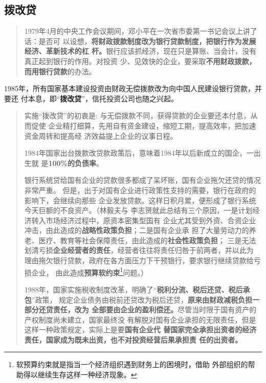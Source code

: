 \subsection{拨改贷}

\begin{quotation}
  1979年4月的中央工作会议期间，邓小平在一次省市委第一书记会议上讲了话：是否可
  以设想，\textbf{将财政拨款制度改为银行贷款制度，把银行作为发展经济、革新技术的杠
    杆。}银行应该抓经济，现在只是算账、当会计，没有真正起到银行的作用。对投资
  少、见效快的企业，要采取\textbf{不用财政拨款，而用银行贷款}的办法。\cite{bogaidai30}
\end{quotation}

1985年，所有国家基本建设投资由财政无偿拨款改为向中国人民建设银行贷款，并要还
付本息，即“\textbf{拨改贷}”，信托投资公司也随之兴起。
\begin{quotation}
  实施“拨改贷”的初衷是: 与无偿拨款不同，获得贷款的企业要还本付息，从而促使
  企业精打细算，先用自有资金建设，缩短工期，提高效率，把加速资金周转和提高经
  济效益提上企业的议事日程。

  1984年国家出台拨款改贷款政策后，意味着1984年以后新成立的国企，一出生就
  是\textbf{100\%的负债率}。\cite{bogaidaizhaizhuangu}


  银行系统贷给国有企业的贷款很多都成了呆坏账，国有企业拖欠还贷的情况非常严重。
  但是，出于对国有企业进行政策性支持的需要，银行在政府的影响下，会继续向那些
  企业发放贷款。这样日积月累，便形成了银行系统今天巨额的不良资产。（林毅夫与
  李志赟就此总结有三个原因，一是计划经济转入市场经济过程中，原资本密集型国有
  企业尤其受到外资、合资企业冲击，由此造成的\textbf{战略性政策负担}；二是国有企业承
  担了大量劳动力的养老、医疗、教育等社会保障责任，由此造成的\textbf{社会性政策负担}；
  三是无法划清亏损\textbf{企业经营者的责任}，经营者往往将责任归咎于前两者，并以此为
  理由拖欠银行贷款，政府在各方面压力下干预银行，要求银行继续贷款给亏损企业，
  由此造成\textbf{预算软约束}\footnote{软预算约束就是指当一个经济组织遇到财务上的困境时，借助
    外部组织的帮助得以继续生存这样一种经济现象。}问题。）\cite{guoyoujinrong}

  1988年，国家实施税收制度改革，明确了“\textbf{税利分流、税后还贷、税后承包}”政策，
  规定企业债务由税前还贷改为税后还贷，\textbf{原来由财政减税负担一部分还贷责任，改为
  全部要由企业的盈利偿还。}尽管当时限于国有资产的产权制度尚未建立，国家最终没
  有解脱对国有企业承担的无限责任，但是这样一种政策规定，实际上是要\textbf{国有企业代
  替国家完全承担出资者的经济责任，国家成为既未出资，也不对投资经营后果承担责
  任的出资者。}\cite{bogaidai30}
\end{quotation}

